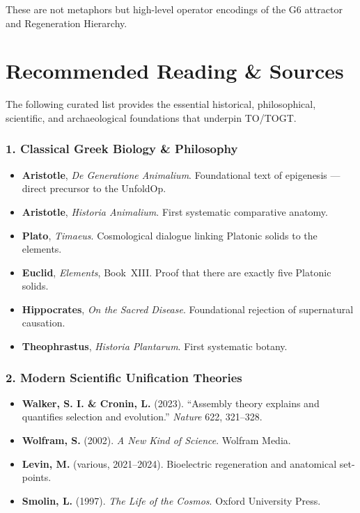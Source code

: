 These are not metaphors but high-level operator encodings of the G6 attractor and Regeneration Hierarchy.

\chapter{Recommended Reading \& Sources}

The following curated list provides the essential historical, philosophical, scientific, and archaeological foundations that underpin TO/TOGT.

\subsection{1. Classical Greek Biology \& Philosophy}

\begin{itemize}
\item \textbf{Aristotle}, \emph{De Generatione Animalium}. Foundational text of epigenesis --- direct precursor to the UnfoldOp.
\item \textbf{Aristotle}, \emph{Historia Animalium}. First systematic comparative anatomy.
\item \textbf{Plato}, \emph{Timaeus}. Cosmological dialogue linking Platonic solids to the elements.
\item \textbf{Euclid}, \emph{Elements}, Book~XIII. Proof that there are exactly five Platonic solids.
\item \textbf{Hippocrates}, \emph{On the Sacred Disease}. Foundational rejection of supernatural causation.
\item \textbf{Theophrastus}, \emph{Historia Plantarum}. First systematic botany.
\end{itemize}

\subsection{2. Modern Scientific Unification Theories}

\begin{itemize}
\item \textbf{Walker, S. I. \& Cronin, L.} (2023). ``Assembly theory explains and quantifies selection and evolution.'' \emph{Nature} 622, 321--328.
\item \textbf{Wolfram, S.} (2002). \emph{A New Kind of Science}. Wolfram Media.
\item \textbf{Levin, M.} (various, 2021--2024). Bioelectric regeneration and anatomical set-points.
\item \textbf{Smolin, L.} (1997). \emph{The Life of the Cosmos}. Oxford University Press.
\end{itemize}

